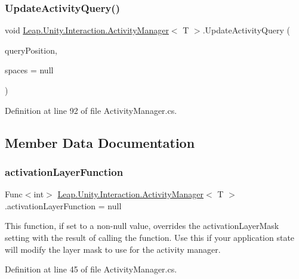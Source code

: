 \subsubsection{\texorpdfstring{UpdateActivityQuery()}{UpdateActivityQuery()}}
{\footnotesize\ttfamily void \mbox{\hyperlink{class_leap_1_1_unity_1_1_interaction_1_1_activity_manager}{Leap.\+Unity.\+Interaction.\+Activity\+Manager}}$<$ T $>$.Update\+Activity\+Query (\begin{DoxyParamCaption}\item[{Vector3?}]{query\+Position,  }\item[{List$<$ \mbox{\hyperlink{class_leap_1_1_unity_1_1_space_1_1_leap_space}{Leap\+Space}} $>$}]{spaces = {\ttfamily null} }\end{DoxyParamCaption})}



Definition at line 92 of file Activity\+Manager.\+cs.



\subsection{Member Data Documentation}
\mbox{\label{class_leap_1_1_unity_1_1_interaction_1_1_activity_manager_a37e3a110090bac9e2498bb3f978c823f}} 
\subsubsection{\texorpdfstring{activationLayerFunction}{activationLayerFunction}}
{\footnotesize\ttfamily Func$<$int$>$ \mbox{\hyperlink{class_leap_1_1_unity_1_1_interaction_1_1_activity_manager}{Leap.\+Unity.\+Interaction.\+Activity\+Manager}}$<$ T $>$.activation\+Layer\+Function = null}



This function, if set to a non-\/null value, overrides the activation\+Layer\+Mask setting with the result of calling the function. Use this if your application state will modify the layer mask to use for the activity manager. 



Definition at line 45 of file Activity\+Manager.\+cs.

